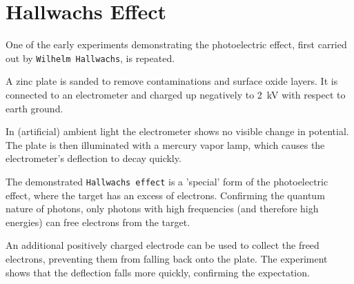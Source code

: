 \chapter{Hallwachs Effect}

One of the early experiments demonstrating the photoelectric effect, first carried out by \texttt{Wilhelm Hallwachs}, is repeated.

A zinc plate is sanded to remove contaminations and surface oxide layers.
It is connected to an electrometer and charged up negatively to \SI{2}{\kV} with respect to earth ground.

In (artificial) ambient light the electrometer shows no visible change in potential.
The plate is then illuminated with a mercury vapor lamp, which causes the electrometer's deflection to decay quickly.

The demonstrated \texttt{Hallwachs effect} is a 'special' form of the photoelectric effect, where the target has an excess of electrons.
Confirming the quantum nature of photons, only photons with high frequencies (and therefore high energies) can free electrons from the target.

An additional positively charged electrode can be used to collect the freed electrons, preventing them from falling back onto the plate.
The experiment shows that the deflection falls more quickly, confirming the expectation.
